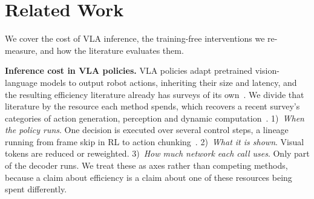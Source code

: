 %
%
%

\section{Related Work}

We cover the cost of VLA inference, the training-free interventions we
re-measure, and how the literature evaluates them.

\textbf{Inference cost in VLA policies.} VLA policies adapt pretrained
vision-language models to output robot actions, inheriting their size and
latency, and the resulting efficiency literature already has surveys of its
own~\cite{effvlasurvey1, effvlasurvey2}. We divide that literature by the
resource each method spends, which recovers a recent survey's categories of
action generation, perception and dynamic computation~\cite{effvlasurvey1}.
1)~\emph{When the policy runs}. One decision is executed over several control
steps, a lineage running from frame skip in RL to action chunking~\cite{dqn,
act, diffusionpolicy, openvlaoft}. 2)~\emph{What it is shown}. Visual tokens
are reduced or reweighted. 3)~\emph{How much network each call uses}. Only
part of the decoder runs. We treat these as axes rather than competing
methods, because a claim about efficiency is a claim about one of these
resources being spent differently.

